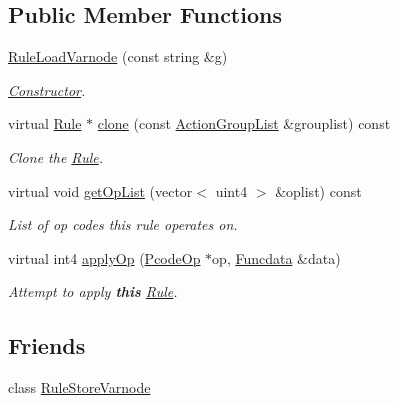 \subsection*{Public Member Functions}
\begin{DoxyCompactItemize}
\item 
\mbox{\hyperlink{class_rule_load_varnode_a1e78f437e9ff5a21f6b2fe3ffa97ccda}{Rule\+Load\+Varnode}} (const string \&g)
\begin{DoxyCompactList}\small\item\em \mbox{\hyperlink{class_constructor}{Constructor}}. \end{DoxyCompactList}\item 
virtual \mbox{\hyperlink{class_rule}{Rule}} $\ast$ \mbox{\hyperlink{class_rule_load_varnode_a7f29e5dd4a43fa70e6cc1bf882b4e807}{clone}} (const \mbox{\hyperlink{class_action_group_list}{Action\+Group\+List}} \&grouplist) const
\begin{DoxyCompactList}\small\item\em Clone the \mbox{\hyperlink{class_rule}{Rule}}. \end{DoxyCompactList}\item 
virtual void \mbox{\hyperlink{class_rule_load_varnode_ae9ad3245a63ae138d3b6de56221ec111}{get\+Op\+List}} (vector$<$ uint4 $>$ \&oplist) const
\begin{DoxyCompactList}\small\item\em List of op codes this rule operates on. \end{DoxyCompactList}\item 
virtual int4 \mbox{\hyperlink{class_rule_load_varnode_aba1b981179387a727272c5ba7b407777}{apply\+Op}} (\mbox{\hyperlink{class_pcode_op}{Pcode\+Op}} $\ast$op, \mbox{\hyperlink{class_funcdata}{Funcdata}} \&data)
\begin{DoxyCompactList}\small\item\em Attempt to apply {\bfseries{this}} \mbox{\hyperlink{class_rule}{Rule}}. \end{DoxyCompactList}\end{DoxyCompactItemize}
\subsection*{Friends}
\begin{DoxyCompactItemize}
\item 
class \mbox{\hyperlink{class_rule_load_varnode_a47339c30a4916725f6225aa5d2bdfe47}{Rule\+Store\+Varnode}}
\end{DoxyCompactItemize}
